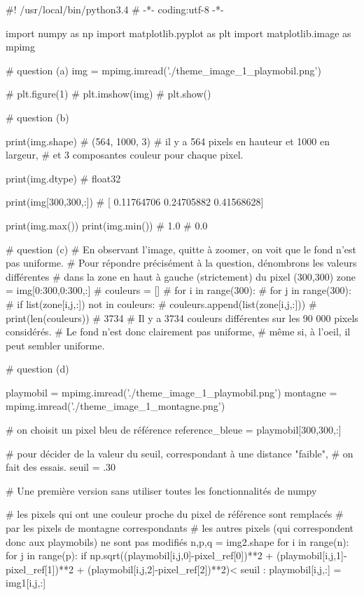 \documentclass[10pt,fleqn]{article} %
\begin{document}
\begin{multicols}{2}
\ifprof
\begin{corrige}
\begin{python}
#! /usr/local/bin/python3.4
# -*- coding:utf-8 -*-
    
import numpy as np
import matplotlib.pyplot as plt
import matplotlib.image as mpimg

# question (a)
img = mpimg.imread('./theme_image_1_playmobil.png')  

# plt.figure(1)
# plt.imshow(img)
# plt.show()

# question (b)

print(img.shape)
# (564, 1000, 3)
# il y a 564 pixels en hauteur et 1000 en largeur,
# et 3 composantes couleur pour chaque pixel.
 
print(img.dtype)
# float32

print(img[300,300,:])
# [ 0.11764706  0.24705882  0.41568628]

print(img.max())
print(img.min())
# 1.0
# 0.0

# question (c)
# En observant l'image, quitte à zoomer, on voit que le fond n'est pas uniforme.
# Pour répondre précisément à la question, dénombrons les valeurs différentes
# dans la zone en haut à gauche (strictement) du pixel (300,300)
zone = img[0:300,0:300,:]
# couleurs = []
# for i in range(300):
#     for j in range(300):
#         if list(zone[i,j,:]) not in couleurs:
#             couleurs.append(list(zone[i,j,:]))
# print(len(couleurs))
# 3734
# Il y a 3734 couleurs différentes sur les 90 000 pixels considérés.
# Le fond n'est donc clairement pas uniforme,
# même si, à l'oeil, il peut sembler uniforme.

# question (d)

playmobil = mpimg.imread('./theme_image_1_playmobil.png')  
montagne = mpimg.imread('./theme_image_1_montagne.png')

# on choisit un pixel bleu de référence
reference_bleue = playmobil[300,300,:]

# pour décider de la valeur du seuil, correspondant à une distance "faible",
# on fait des essais. 
seuil = .30

# Une première version sans utiliser toutes les fonctionnalités de numpy

# les pixels qui ont une couleur proche du pixel de référence sont remplacés
# par les pixels de montagne correspondants
# les autres pixels (qui correspondent donc aux playmobils) ne sont pas modifiés
n,p,q = img2.shape
for i in range(n):
    for j in range(p):
        if np.sqrt((playmobil[i,j,0]-pixel_ref[0])**2 + (playmobil[i,j,1]-pixel_ref[1])**2
                   + (playmobil[i,j,2]-pixel_ref[2])**2)< seuil :
            playmobil[i,j,:] = img1[i,j,:]


\end{python}
\end{corrige}
\end{multicols}
\end{document}
